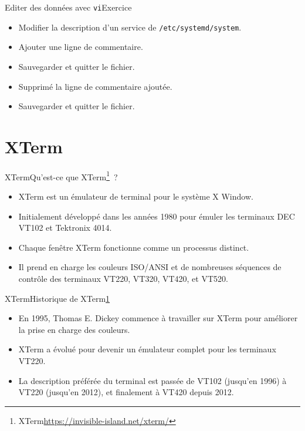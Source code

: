 \documentclass{beamer}
\begin{document}
    \begin{frame}{Editer des données avec \lstinline{vi}}{Exercice \execcounterdispinc}
        \begin{itemize}
            \item Modifier la description d'un service de \lstinline{/etc/systemd/system}.
            \item Ajouter une ligne de commentaire.
            \item Sauvegarder et quitter le fichier.
            \item Supprimé la ligne de commentaire ajoutée.
            \item Sauvegarder et quitter le fichier.
        \end{itemize}
    \end{frame}


    \section{XTerm}\label{sec:xterm}

    \begin{frame}{XTerm}{Qu'est-ce que XTerm\footnote{\label{xterm}XTerm\url{https://invisible-island.net/xterm/}}~?}
        \begin{itemize}
            \item XTerm est un émulateur de terminal pour le système X Window.
            \item Initialement développé dans les années 1980 pour émuler les terminaux DEC VT102 et Tektronix 4014.
            \item Chaque fenêtre XTerm fonctionne comme un processus distinct.
            \item Il prend en charge les couleurs ISO/ANSI et de nombreuses séquences de contrôle des terminaux VT220, VT320, VT420, et VT520.
        \end{itemize}
    \end{frame}

    \begin{frame}{XTerm}{Historique de XTerm\cref{xterm}}
        \begin{itemize}
            \item En 1995, Thomas E. Dickey commence à travailler sur XTerm pour améliorer la prise en charge des couleurs.
            \item XTerm a évolué pour devenir un émulateur complet pour les terminaux VT220.
            \item La description préférée du terminal est passée de VT102 (jusqu'en 1996) à VT220 (jusqu'en 2012), et finalement à VT420 depuis 2012.
        \end{itemize}
    \end{frame}
\end{document}
